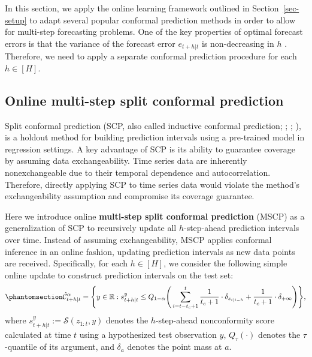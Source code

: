 \documentclass[
  11pt,
  a4paper,
]{article}
\theoremstyle{plain}
\theoremstyle{remark}
\begin{document}
In this section, we apply the online learning framework outlined in
Section~\ref{sec-setup} to adapt several popular conformal prediction
methods in order to allow for multi-step forecasting problems. One of
the key properties of optimal forecast errors is that the variance of
the forecast error \(e_{t+h|t}\) is non-decreasing in \(h\)
\autocite{diebold1996,patton2007}. Therefore, we need to apply a
separate conformal prediction procedure for each \(h \in [H]\).

\subsection{Online multi-step split conformal
prediction}\label{online-multi-step-split-conformal-prediction}

Split conformal prediction (SCP, also called inductive conformal
prediction; \textcite{papadopoulos2002}; \textcite{vovk2005};
\textcite{lei2018}), is a holdout method for building prediction
intervals using a pre-trained model in regression settings. A key
advantage of SCP is its ability to guarantee coverage by assuming data
exchangeability. Time series data are inherently nonexchangeable due to
their temporal dependence and autocorrelation. Therefore, directly
applying SCP to time series data would violate the method's
exchangeability assumption and compromise its coverage guarantee.

Here we introduce online \textbf{multi-step split conformal prediction}
(MSCP) as a generalization of SCP to recursively update all
\(h\)-step-ahead prediction intervals over time. Instead of assuming
exchangeability, MSCP applies conformal inference in an online fashion,
updating prediction intervals as new data points are received.
Specifically, for each \(h \in [H]\), we consider the following simple
online update to construct prediction intervals on the test set:
\begin{equation}\phantomsection\label{eq-mscp}{
\hat{\mathcal{C}}_{t+h|t}^{\alpha} = \Bigg\{y\in\mathbb{R}: s_{t+h|t}^{y} \leq Q_{1-\alpha}\Bigg(\sum_{i=t-t_c+1}^{t}\frac{1}{t_c+1}\cdot\delta_{s_{i|i-h}}+\frac{1}{t_c+1}\cdot\delta_{+\infty}\Bigg)\Bigg\},
}\end{equation} where \(s_{t+h|t}^{y}:=\mathcal{S}(z_{1:t}, y)\) denotes
the \(h\)-step-ahead nonconformity score calculated at time \(t\) using
a hypothesized test observation \(y\), \(Q_\tau(\cdot)\) denotes the
\(\tau\)-quantile of its argument, and \(\delta_a\) denotes the point
mass at \(a\).
\end{document}
